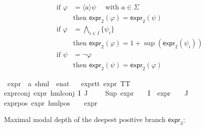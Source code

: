 \begin{isabellebody}
\begin{isamarkuptext}
\begin{align*}
    \text{if } \varphi &= \langle a \rangle \psi \quad \text{ with } a \in \Sigma \\
    & \text{then } \textsf{expr}_2(\varphi) = \textsf{expr}_2(\psi) \\
    \text{if } \varphi &= \bigwedge_{i \in I} \{\psi_i \} \\
    & \text{then } \textsf{expr}_2(\varphi) = 1 + \sup(\textsf{expr}_2(\psi_i)) \\
    \text{if } \psi &= \neg \varphi \\
    & \text{then } \textsf{expr}_2(\psi) = \textsf{expr}_2(\varphi)
\end{align*}%
\end{isamarkuptext}\isamarkuptrue%
\isamarkupfalse%
\ expr{\isacharunderscore}{\kern0pt}{}\ {\isacharcolon}{\kern0pt}{\isacharcolon}{\kern0pt}\ {\isachardoublequoteopen}{\isacharparenleft}{\kern0pt}{\isacharprime}{\kern0pt}a{\isacharcomma}{\kern0pt}\ {\isacharprime}{\kern0pt}s{\isacharparenright}{\kern0pt}hml\ {\isasymRightarrow}\ enat{\isachardoublequoteclose}\isanewline
\ \ \isanewline
expr{\isacharunderscore}{\kern0pt}{}{\isacharunderscore}{\kern0pt}tt{\isacharcolon}{\kern0pt}\ {\isacartoucheopen}expr{\isacharunderscore}{\kern0pt}{}\ TT\ {\isacharequal}{\kern0pt}\ {}{\isacartoucheclose}\ {\isacharbar}{\kern0pt}\isanewline
expr{\isacharunderscore}{\kern0pt}{}{\isacharunderscore}{\kern0pt}conj{\isacharcolon}{\kern0pt}\ {\isacartoucheopen}expr{\isacharunderscore}{\kern0pt}{}\ {\isacharparenleft}{\kern0pt}hml{\isacharunderscore}{\kern0pt}conj\ I\ J\ {\isasymPhi}{\isacharparenright}{\kern0pt}\ {\isacharequal}{\kern0pt}\ {}\ {\isacharplus}{\kern0pt}\ Sup\ {\isacharparenleft}{\kern0pt}{\isacharparenleft}{\kern0pt}expr{\isacharunderscore}{\kern0pt}{}\ {\isasymcirc}\ {\isasymPhi}{\isacharparenright}{\kern0pt}\ {\isacharbackquote}{\kern0pt}\ I\ {\isasymunion}\ {\isacharparenleft}{\kern0pt}expr{\isacharunderscore}{\kern0pt}{}\ {\isasymcirc}\ {\isasymPhi}{\isacharparenright}{\kern0pt}\ {\isacharbackquote}{\kern0pt}\ J{\isacharparenright}{\kern0pt}{\isacartoucheclose}\ {\isacharbar}{\kern0pt}\isanewline
expr{\isacharunderscore}{\kern0pt}{}{\isacharunderscore}{\kern0pt}pos{\isacharcolon}{\kern0pt}\ {\isacartoucheopen}expr{\isacharunderscore}{\kern0pt}{}\ {\isacharparenleft}{\kern0pt}hml{\isacharunderscore}{\kern0pt}pos\ {\isasymalpha}\ {\isasymphi}{\isacharparenright}{\kern0pt}\ {\isacharequal}{\kern0pt}\ expr{\isacharunderscore}{\kern0pt}{}\ {\isasymphi}{\isacartoucheclose}%
\begin{isamarkuptext}%
Maximal modal depth of the deepest positive branch $\textsf{expr}_3$:


\end{isamarkuptext}
\end{isabellebody}
